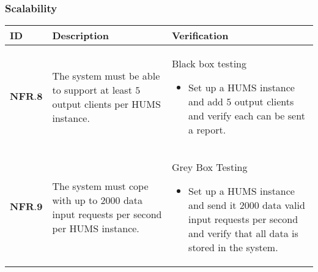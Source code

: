 \subsubsection{Scalability}
\begin{longtable}[H]{|p{1.5cm}|p{4.5cm}|p{10.5cm}|}
    \hline
    \cellcolor{titleColor}\textbf{ID} & \cellcolor{titleColor}\textbf{Description} & \cellcolor{titleColor}\textbf{Verification} \\ \hline
   $ \textbf{NFR.8} $& The system must be able to support at least $5$ output clients per HUMS instance. & Black box testing\begin{itemize}\item Set up a HUMS instance and add $5$ output clients and verify each can be sent a report.\end{itemize} \\ \hline
   $  \textbf{NFR.9} $& The system must cope with up to $2000$ data input requests per second per HUMS instance. & Grey Box Testing\begin{itemize}\item Set up a HUMS instance and send it $2000$ data valid input requests per second and verify that all data is stored in the system.\end{itemize} \\ \hline
\end{longtable}

